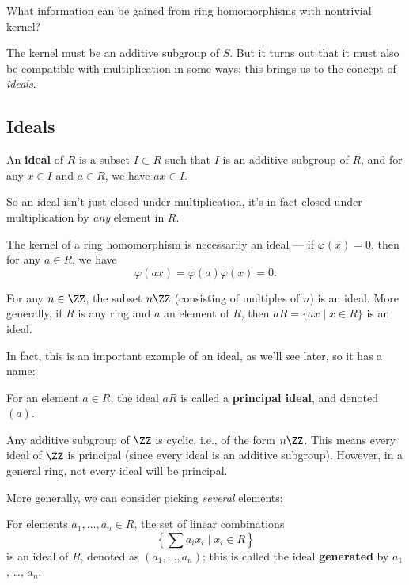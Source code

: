 \begin{qq}
What information can be gained from ring homomorphisms with nontrivial kernel?
\end{qq}

The kernel must be an additive subgroup of $S$. But it turns out that it must also be compatible with multiplication in some ways; this brings us to the concept of \emph{ideals}. 

\subsection{Ideals}

\vspace{0.75em}

\begin{definition}[Ideal]
An \textbf{ideal} of $R$ is a subset $I \subset R$ such that $I$ is an additive subgroup of $R$, and for any $x \in I$ and $a \in R$, we have $ax \in I$. 
\end{definition}

So an ideal isn't just closed under multiplication, it's in fact closed under multiplication by \emph{any} element in $R$. 

The kernel of a ring homomorphism is necessarily an ideal --- if $\varphi(x) = 0$, then for any $a \in R$, we have \[\varphi(ax) = \varphi(a)\varphi(x) = 0.\]  

\begin{example}
For any $n \in \ZZ$, the subset $n\ZZ$ (consisting of multiples of $n$) is an ideal. More generally, if $R$ is any ring and $a$ an element of $R$, then $aR = \{ax \mid x \in R\}$ is an ideal. 
\end{example}

In fact, this is an important example of an ideal, as we'll see later, so it has a name:

\begin{definition}
For an element $a \in R$, the ideal $aR$ is called a \textbf{principal ideal}, and denoted $(a)$. 
\end{definition}

Any additive subgroup of $\ZZ$ is cyclic, i.e., of the form $n\ZZ$. This means every ideal of $\ZZ$ is principal (since every ideal is an additive subgroup). However, in a general ring, not every ideal will be principal. 

More generally, we can consider picking \emph{several} elements:
\begin{definition}
For elements $a_1, \ldots, a_n \in R$, the set of linear combinations \[\left\{\sum a_ix_i \mid x_i \in R\right\}\] is an ideal of $R$, denoted as $(a_1, \ldots, a_n)$; this is called the ideal \textbf{generated} by $a_1$, \ldots, $a_n$. 
\end{definition}

